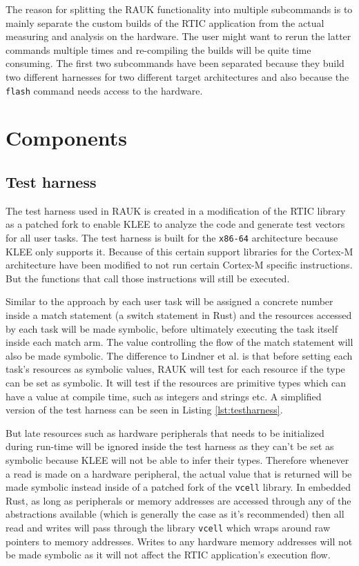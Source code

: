 The reason for splitting the RAUK functionality into multiple subcommands is to
mainly separate the custom builds of the RTIC application from the actual
measuring and analysis on the hardware. The user might want to rerun the latter
commands multiple times and re-compiling the builds will be quite time
consuming. The first two subcommands have been separated because they build
two different harnesses for two different target architectures and also because
the \texttt{flash} command needs access to the hardware.

\section{Components}

\subsection{Test harness}
The test harness used in RAUK is created in a modification of the RTIC library
as a patched fork to enable KLEE to analyze the code and generate test vectors
for all user tasks. The test harness is built for the \texttt{x86-64}
architecture because KLEE only supports it. Because of this certain support
libraries for the Cortex-M architecture have been modified to not run certain
Cortex-M specific instructions. But the functions that call those instructions
will still be executed.

Similar to the approach by \cite{lindner} each user task will be assigned a
concrete number inside a match statement (a switch statement in Rust) and the
resources accessed by each task will be made symbolic, before ultimately
executing the task itself inside each match arm. The value controlling the flow
of the match statement will also be made symbolic. The difference to Lindner et
al. is that before setting each task's resources as symbolic values, RAUK will
test for each resource if the type can be set as symbolic. It will test if the
resources are primitive types which can have a value at compile time, such as
integers and strings etc. A simplified version of the test harness can be seen
in Listing \ref{lst:testharness}.



But late resources such as hardware peripherals that needs to be initialized
during run-time will be ignored inside the test harness as they can't be set as
symbolic because KLEE will not be able to infer their types. Therefore whenever
a read is made on a hardware peripheral, the actual value that is returned will
be made symbolic instead inside of a patched fork of the \texttt{vcell}
library. In embedded Rust, as long as peripherals or memory addresses are
accessed through any of the abstractions available (which is generally the case
as it's recommended) then all read and writes will pass through the library
\texttt{vcell} which wraps around raw pointers to memory addresses. Writes to
any hardware memory addresses will not be made symbolic as it will not affect
the RTIC application's execution flow.

